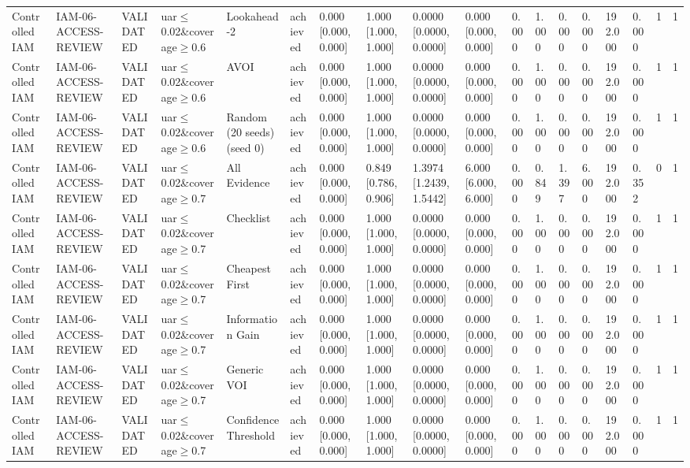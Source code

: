 \begin{table}[!ht]
{\begin{tabular}{llllllllllllllllll}
Controlled IAM & IAM-06-ACCESS-REVIEW & VALIDATED & uar$\le$0.02\&coverage$\ge$0.6 & Lookahead-2 & achieved & 0.000 [0.000, 0.000] & 1.000 [1.000, 1.000] & 0.0000 [0.0000, 0.0000] & 0.000 [0.000, 0.000] & 0.000 & 1.000 & 0.000 & 0.000 & 192.000 & 0.000 & 1 & 1 \\
Controlled IAM & IAM-06-ACCESS-REVIEW & VALIDATED & uar$\le$0.02\&coverage$\ge$0.6 & AVOI & achieved & 0.000 [0.000, 0.000] & 1.000 [1.000, 1.000] & 0.0000 [0.0000, 0.0000] & 0.000 [0.000, 0.000] & 0.000 & 1.000 & 0.000 & 0.000 & 192.000 & 0.000 & 1 & 1 \\
Controlled IAM & IAM-06-ACCESS-REVIEW & VALIDATED & uar$\le$0.02\&coverage$\ge$0.6 & Random (20 seeds) (seed 0) & achieved & 0.000 [0.000, 0.000] & 1.000 [1.000, 1.000] & 0.0000 [0.0000, 0.0000] & 0.000 [0.000, 0.000] & 0.000 & 1.000 & 0.000 & 0.000 & 192.000 & 0.000 & 1 & 1 \\
Controlled IAM & IAM-06-ACCESS-REVIEW & VALIDATED & uar$\le$0.02\&coverage$\ge$0.7 & All Evidence & achieved & 0.000 [0.000, 0.000] & 0.849 [0.786, 0.906] & 1.3974 [1.2439, 1.5442] & 6.000 [6.000, 6.000] & 0.000 & 0.849 & 1.397 & 6.000 & 192.000 & 0.352 & 0 & 1 \\
Controlled IAM & IAM-06-ACCESS-REVIEW & VALIDATED & uar$\le$0.02\&coverage$\ge$0.7 & Checklist & achieved & 0.000 [0.000, 0.000] & 1.000 [1.000, 1.000] & 0.0000 [0.0000, 0.0000] & 0.000 [0.000, 0.000] & 0.000 & 1.000 & 0.000 & 0.000 & 192.000 & 0.000 & 1 & 1 \\
Controlled IAM & IAM-06-ACCESS-REVIEW & VALIDATED & uar$\le$0.02\&coverage$\ge$0.7 & Cheapest First & achieved & 0.000 [0.000, 0.000] & 1.000 [1.000, 1.000] & 0.0000 [0.0000, 0.0000] & 0.000 [0.000, 0.000] & 0.000 & 1.000 & 0.000 & 0.000 & 192.000 & 0.000 & 1 & 1 \\
Controlled IAM & IAM-06-ACCESS-REVIEW & VALIDATED & uar$\le$0.02\&coverage$\ge$0.7 & Information Gain & achieved & 0.000 [0.000, 0.000] & 1.000 [1.000, 1.000] & 0.0000 [0.0000, 0.0000] & 0.000 [0.000, 0.000] & 0.000 & 1.000 & 0.000 & 0.000 & 192.000 & 0.000 & 1 & 1 \\
Controlled IAM & IAM-06-ACCESS-REVIEW & VALIDATED & uar$\le$0.02\&coverage$\ge$0.7 & Generic VOI & achieved & 0.000 [0.000, 0.000] & 1.000 [1.000, 1.000] & 0.0000 [0.0000, 0.0000] & 0.000 [0.000, 0.000] & 0.000 & 1.000 & 0.000 & 0.000 & 192.000 & 0.000 & 1 & 1 \\
Controlled IAM & IAM-06-ACCESS-REVIEW & VALIDATED & uar$\le$0.02\&coverage$\ge$0.7 & Confidence Threshold & achieved & 0.000 [0.000, 0.000] & 1.000 [1.000, 1.000] & 0.0000 [0.0000, 0.0000] & 0.000 [0.000, 0.000] & 0.000 & 1.000 & 0.000 & 0.000 & 192.000 & 0.000 & 1 & 1 \\

\end{tabular}}
\end{table}
